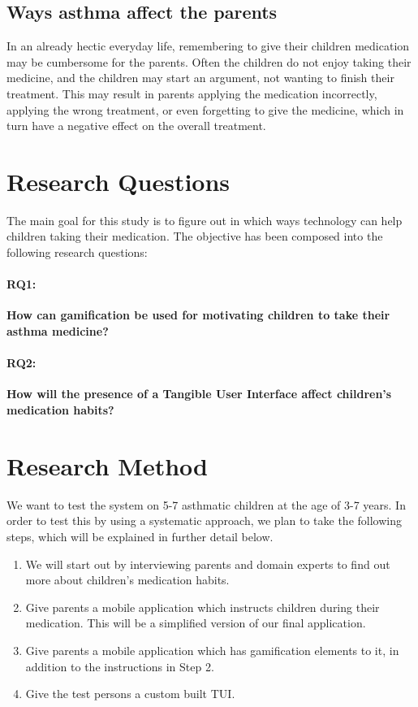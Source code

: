 \subsection{Ways asthma affect the parents}
In an already hectic everyday life, remembering to give their children medication may be cumbersome for the parents. Often the children do not enjoy taking their medicine, and the children may start an argument, not wanting to finish their treatment. This may result in parents applying the medication incorrectly, applying the wrong treatment, or even forgetting to give the medicine, which in turn have a negative effect on the overall treatment.  



\section{Research Questions}
\label{sec:researchquestions}
The main goal for this study is to figure out in which ways technology can help children taking their medication. The objective has been composed into the following research questions: 

\paragraph{RQ1:}
\textbf{How can gamification be used for motivating children to take their asthma medicine?}


\paragraph{RQ2:}
\textbf{How will the presence of a Tangible User Interface affect children's medication habits?}


\section{Research Method}
\label{sec:researchmethod}

We want to test the system on 5-7 asthmatic children at the age of 3-7 years. In order to test this by using a systematic approach, we plan to take the following steps, which will be explained in further detail below. 

\begin{enumerate}
  \item We will start out by interviewing parents and domain experts to find out more about children's medication habits. 
  \item Give parents a mobile application which instructs children during their medication. This will be a simplified version of our final application.  
  \item Give parents a mobile application which has gamification elements to it, in addition to the instructions in Step 2. 
  \item Give the test persons a custom built TUI. 
\end{enumerate}
 

